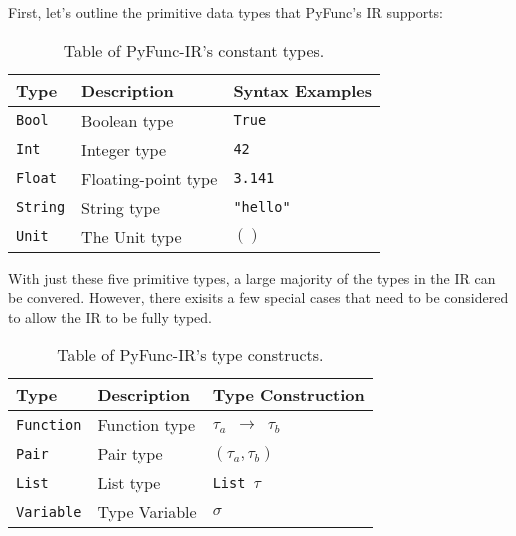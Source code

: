 \documentclass{l4proj}
\begin{document}
First, let's outline the primitive data types that PyFunc's IR supports:

\begin{table}[h]
\caption{Table of PyFunc-IR's constant types.}
\label{tab:pyfunc-ir-constants}
\begin{center}
\begin{tabular}{@{}|l|l|l|@{}}
    \hline
    \textbf{Type}        & \textbf{Description}      & \textbf{Syntax Examples}  \\
    \hline
    \texttt{Bool}        & Boolean type              & \texttt{True}       \\
    \texttt{Int}         & Integer type              & \texttt{42}         \\
    \texttt{Float}       & Floating-point type       & \texttt{3.141}      \\
    \texttt{String}      & String type               & \texttt{"hello"}    \\
    \texttt{Unit}        & The Unit type             & \texttt{$()$}       \\ 
    \hline
\end{tabular}
\end{center}
\end{table}

With just these five primitive types, a large majority of the types in the IR can be convered.
However, there exisits a few special cases that need to be considered to allow the IR to be fully typed.

\begin{table}[h]
\caption{Table of PyFunc-IR's type constructs.}
\label{tab:pyfunc-ir-type-constructs}
\begin{center}
\begin{tabular}{@{}|l|l|l|@{}}
    \hline
    \textbf{Type}        & \textbf{Description}      & \textbf{Type Construction}  \\
    \hline
    \texttt{Function}    & Function type             & \texttt{$\tau_a$ $\rightarrow$ $\tau_b$} \\
    \texttt{Pair}        & Pair type                 & \texttt{$(\tau_a, \tau_b)$} \\
    \texttt{List}        & List type                 & \texttt{List $\tau$} \\
    \texttt{Variable}    & Type Variable             & \texttt{$\sigma$} \\
    \hline
\end{tabular}
\end{center}
\end{table}
\end{document}
